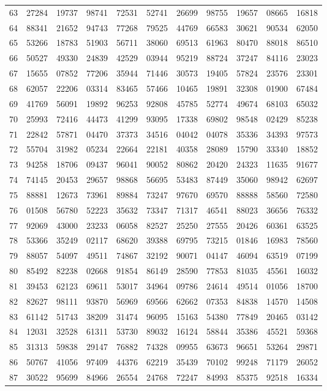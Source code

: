 \begin{table}
\begin{otherlanguage}{english}
\begin{tabular}{|C|CCCCCCCCCC|}
63&27284&19737&98741&72531&52741&26699&98755&19657&08665&16818\\
64&88341&21652&94743&77268&79525&44769&66583&30621&90534&62050\\[1ex]
65&53266&18783&51903&56711&38060&69513&61963&80470&88018&86510\\
66&50527&49330&24839&42529&03944&95219&88724&37247&84116&23023\\
67&15655&07852&77206&35944&71446&30573&19405&57824&23576&23301\\
68&62057&22206&03314&83465&57466&10465&19891&32308&01900&67484\\
69&41769&56091&19892&96253&92808&45785&52774&49674&68103&65032\\[1ex]
70&25993&72416&44473&41299&93095&17338&69802&98548&02429&85238\\
71&22842&57871&04470&37373&34516&04042&04078&35336&34393&97573\\
72&55704&31982&05234&22664&22181&40358&28089&15790&33340&18852\\
73&94258&18706&09437&96041&90052&80862&20420&24323&11635&91677\\
74&74145&20453&29657&98868&56695&53483&87449&35060&98942&62697\\[1ex]
75&88881&12673&73961&89884&73247&97670&69570&88888&58560&72580\\
76&01508&56780&52223&35632&73347&71317&46541&88023&36656&76332\\
77&92069&43000&23233&06058&82527&25250&27555&20426&60361&63525\\
78&53366&35249&02117&68620&39388&69795&73215&01846&16983&78560\\
79&88057&54097&49511&74867&32192&90071&04147&46094&63519&07199\\[1ex]
80&85492&82238&02668&91854&86149&28590&77853&81035&45561&16032\\
81&39453&62123&69611&53017&34964&09786&24614&49514&01056&18700\\
82&82627&98111&93870&56969&69566&62662&07353&84838&14570&14508\\
83&61142&51743&38209&31474&96095&15163&54380&77849&20465&03142\\
84&12031&32528&61311&53730&89032&16124&58844&35386&45521&59368\\[1ex]
85&31313&59838&29147&76882&74328&09955&63673&96651&53264&29871\\
86&50767&41056&97409&44376&62219&35439&70102&99248&71179&26052\\
87&30522&95699&84966&26554&24768&72247&84993&85375&92518&16334\\

\end{tabular}
\end{otherlanguage}
\end{table}
